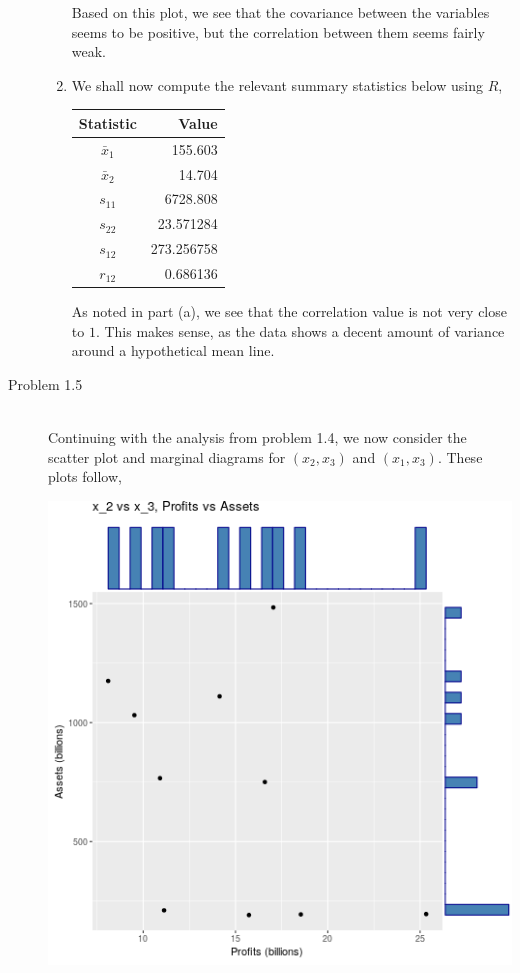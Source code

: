 \documentclass[letterpaper,10pt]{article}
\begin{document}
\begin{description}
\begin{enumerate}[label=(\alph*)]
\begin{center}
\end{center}
Based on this plot, we see that the covariance between the variables seems to be positive, but the correlation between them seems fairly weak.
\item We shall now compute the relevant summary statistics below using $R$,
\begin{center}
\begin{tabular}{c|r}
Statistic & Value\\\hline
$\bar{x}_1$ & 155.603\\
$\bar{x}_2$ & 14.704\\
$s_{11}$ & 6728.808\\
$s_{22}$ & 23.571284\\
$s_{12}$ & 273.256758\\
$r_{12}$ & 0.686136\\
\end{tabular}
\end{center}
As noted in part (a), we see that the correlation value is not very close to $1$. This makes sense, as the data shows a decent amount of variance around a hypothetical mean line.
\end{enumerate}
\item[Problem 1.5]\hfill\\
Continuing with the analysis from problem 1.4, we now consider the scatter plot and marginal diagrams for $(x_2,x_3)$ and $(x_1,x_3)$. These plots follow,
\begin{center}
\includegraphics[scale=0.75]{1523scatter.png}

\end{center}
\end{description}
\end{document}
